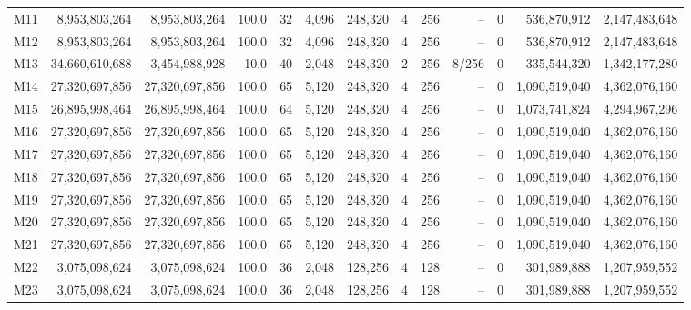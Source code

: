 \documentclass[10pt]{article}
\begin{document}
\begin{landscape}
\begin{longtable}{@{}l r r r r r r r r r r r r@{}}
M11 & 8,953,803,264 & 8,953,803,264 & 100.0 & 32 & 4,096 & 248,320 & 4 & 256 & -- & 0 & 536,870,912 & 2,147,483,648 \\
M12 & 8,953,803,264 & 8,953,803,264 & 100.0 & 32 & 4,096 & 248,320 & 4 & 256 & -- & 0 & 536,870,912 & 2,147,483,648 \\
M13 & 34,660,610,688 & 3,454,988,928 & 10.0 & 40 & 2,048 & 248,320 & 2 & 256 & 8/256 & 0 & 335,544,320 & 1,342,177,280 \\
M14 & 27,320,697,856 & 27,320,697,856 & 100.0 & 65 & 5,120 & 248,320 & 4 & 256 & -- & 0 & 1,090,519,040 & 4,362,076,160 \\
M15 & 26,895,998,464 & 26,895,998,464 & 100.0 & 64 & 5,120 & 248,320 & 4 & 256 & -- & 0 & 1,073,741,824 & 4,294,967,296 \\
M16 & 27,320,697,856 & 27,320,697,856 & 100.0 & 65 & 5,120 & 248,320 & 4 & 256 & -- & 0 & 1,090,519,040 & 4,362,076,160 \\
M17 & 27,320,697,856 & 27,320,697,856 & 100.0 & 65 & 5,120 & 248,320 & 4 & 256 & -- & 0 & 1,090,519,040 & 4,362,076,160 \\
M18 & 27,320,697,856 & 27,320,697,856 & 100.0 & 65 & 5,120 & 248,320 & 4 & 256 & -- & 0 & 1,090,519,040 & 4,362,076,160 \\
M19 & 27,320,697,856 & 27,320,697,856 & 100.0 & 65 & 5,120 & 248,320 & 4 & 256 & -- & 0 & 1,090,519,040 & 4,362,076,160 \\
M20 & 27,320,697,856 & 27,320,697,856 & 100.0 & 65 & 5,120 & 248,320 & 4 & 256 & -- & 0 & 1,090,519,040 & 4,362,076,160 \\
M21 & 27,320,697,856 & 27,320,697,856 & 100.0 & 65 & 5,120 & 248,320 & 4 & 256 & -- & 0 & 1,090,519,040 & 4,362,076,160 \\
M22 & 3,075,098,624 & 3,075,098,624 & 100.0 & 36 & 2,048 & 128,256 & 4 & 128 & -- & 0 & 301,989,888 & 1,207,959,552 \\
M23 & 3,075,098,624 & 3,075,098,624 & 100.0 & 36 & 2,048 & 128,256 & 4 & 128 & -- & 0 & 301,989,888 & 1,207,959,552 \\
\end{longtable}
\endgroup
\end{landscape}
\end{document}
